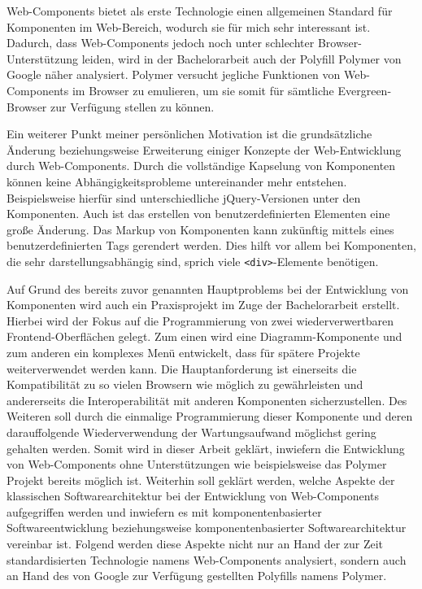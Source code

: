 Web-Components bietet als erste Technologie einen allgemeinen Standard für Komponenten im Web-Bereich, wodurch sie für mich sehr interessant ist. Dadurch, dass Web-Components jedoch noch unter schlechter Browser-Unterstützung leiden, wird in der Bachelorarbeit auch der Polyfill Polymer von Google näher analysiert. Polymer versucht jegliche Funktionen von Web-Components im Browser zu emulieren, um sie somit für sämtliche \glqq Evergreen\grqq -Browser zur Verfügung stellen zu können.

Ein weiterer Punkt meiner persönlichen Motivation ist die grundsätzliche Änderung beziehungsweise Erweiterung einiger Konzepte der Web-Entwicklung durch Web-Components. Durch die vollständige Kapselung von Komponenten können keine Abhängigkeitsprobleme untereinander mehr entstehen. Beispielsweise hierfür sind unterschiedliche jQuery-Versionen unter den Komponenten. Auch ist das erstellen von benutzerdefinierten Elementen eine große Änderung. Das Markup von Komponenten kann zukünftig mittels eines benutzerdefinierten Tags gerendert werden. Dies hilft vor allem bei Komponenten, die sehr darstellungsabhängig sind, sprich viele \lstinline|<div>|-Elemente benötigen.

Auf Grund des bereits zuvor genannten Hauptproblems bei der Entwicklung von Komponenten wird auch ein Praxisprojekt im Zuge der Bachelorarbeit erstellt. Hierbei wird der Fokus auf die Programmierung von zwei wiederverwertbaren Frontend-Oberflächen gelegt. Zum einen wird eine Diagramm-Komponente und zum anderen ein komplexes Menü entwickelt, dass für spätere Projekte weiterverwendet werden kann. Die Hauptanforderung ist einerseits die Kompatibilität zu so vielen Browsern wie möglich zu gewährleisten und andererseits die Interoperabilität mit anderen Komponenten sicherzustellen. Des Weiteren soll durch die einmalige Programmierung dieser Komponente und deren darauffolgende Wiederverwendung der Wartungsaufwand möglichst gering gehalten werden. Somit wird in dieser Arbeit geklärt, inwiefern die Entwicklung von Web-Components ohne Unterstützungen wie beispielsweise das Polymer Projekt bereits möglich ist. Weiterhin soll geklärt werden, welche Aspekte der klassischen Softwarearchitektur bei der Entwicklung von Web-Components aufgegriffen werden und inwiefern es mit komponentenbasierter Softwareentwicklung beziehungsweise komponentenbasierter Softwarearchitektur vereinbar ist. Folgend werden diese Aspekte nicht nur an Hand der zur Zeit standardisierten Technologie namens Web-Components analysiert, sondern auch an Hand des von Google zur Verfügung gestellten Polyfills namens Polymer.
